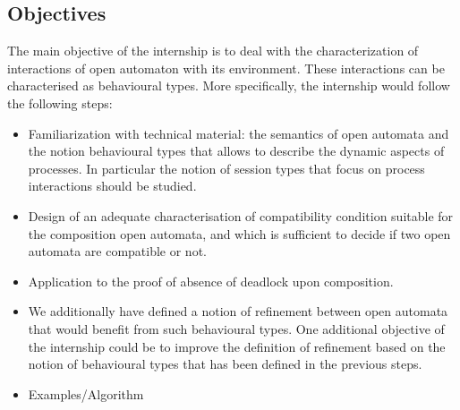 \documentclass[11pt,fleqn]{article}
\begin{document}
\subsection*{Objectives}

The main objective of the internship is to deal with the characterization of interactions  of open automaton with its environment. These interactions can be characterised as behavioural types.
More specifically, the internship would follow the following steps:
\begin{itemize}
\item Familiarization with technical material: the semantics of  open automata and the notion behavioural types \cite{Hans:2016} that allows to describe the dynamic aspects of processes. In particular the notion of session types that focus on process interactions should be studied.

\item Design of an adequate characterisation of  compatibility condition  suitable for the composition open automata, and which is sufficient to decide if two open automata are compatible or not. 

\item Application to the proof of absence of deadlock upon composition.

\item  We additionally have defined a notion of refinement between open automata that would benefit from such behavioural types. One additional objective of the internship could be to improve the definition of refinement based on the notion of behavioural types that has been defined in the previous steps.

\item Examples/Algorithm




\end{itemize}
 
\end{document}
